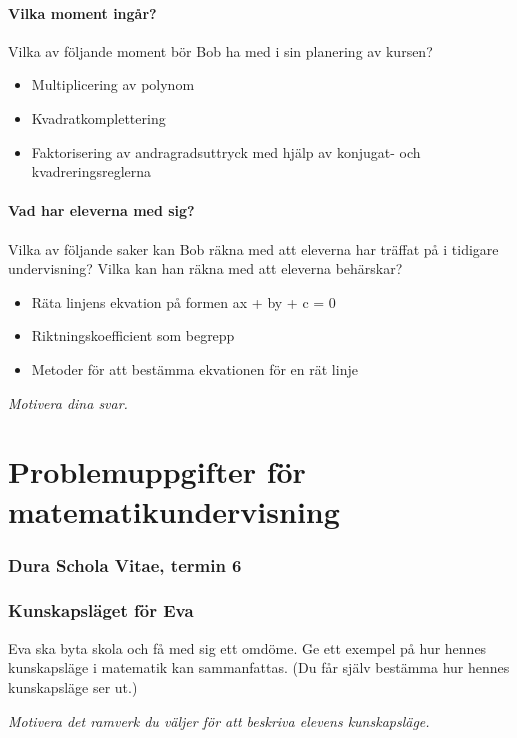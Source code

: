 \subsection{Vilka moment ingår?}
Vilka av följande moment bör Bob ha med i sin planering av kursen?

\begin{itemize}
  \item Multiplicering av polynom
  \item Kvadratkomplettering
  \item Faktorisering av andragradsuttryck med hjälp av konjugat- och kvadreringsreglerna
\end{itemize}

\subsection{Vad har eleverna med sig?}
Vilka av följande saker kan Bob räkna med att eleverna har träffat på i tidigare undervisning? Vilka kan han räkna med att eleverna behärskar?

\begin{itemize}
  \item Räta linjens ekvation på formen ax + by + c = 0
  \item Riktningskoefficient som begrepp
  \item Metoder för att bestämma ekvationen för en rät linje
\end{itemize}

\noindent \emph{Motivera dina svar.}



\newpage
\part*{Problemuppgifter för matematikundervisning}

\section{Dura Schola Vitae, termin 6}

\section{Kunskapsläget för Eva}
Eva ska byta skola och få med sig ett omdöme. Ge ett exempel på hur hennes kunskapsläge i matematik kan sammanfattas. (Du får själv bestämma hur hennes kunskapsläge ser ut.)

\emph{Motivera det ramverk du väljer för att beskriva elevens kunskapsläge.}
